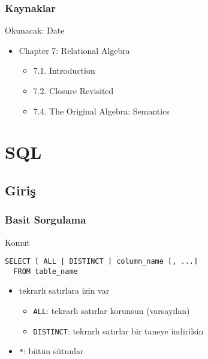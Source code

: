 \documentclass[dvipsnames]{beamer}
\theoremstyle{definition}
\theoremstyle{example}
\theoremstyle{plain}
\begin{document}
\begin{frame}
  \frametitle{Kaynaklar}

  \begin{block}{Okunacak: Date}
    \begin{itemize}
      \item Chapter 7: Relational Algebra
      \begin{itemize}
        \item 7.1. \alert{Introduction}
        \item 7.2. \alert{Closure Revisited}
        \item 7.4. \alert{The Original Algebra: Semantics}
      \end{itemize}
    \end{itemize}
  \end{block}
\end{frame}

\lstset{language=FullSQL}

\section{SQL}

\subsection{Giriş}

\begin{frame}[fragile]
  \frametitle{Basit Sorgulama}

  \begin{block}{Komut}
    \begin{lstlisting}
SELECT [ ALL | DISTINCT ] column_name [, ...]
  FROM table_name
    \end{lstlisting}
  \end{block}

  \pause
  \begin{itemize}
    \item tekrarlı satırlara izin var
    \begin{itemize}
        \item \lstinline!ALL!: tekrarlı satırlar korunsun (varsayılan)
        \item \lstinline!DISTINCT!: tekrarlı satırlar bir taneye indirilsin
    \end{itemize}

    \item \lstinline!*!: bütün sütunlar
  \end{itemize}
\end{frame}
\end{document}
